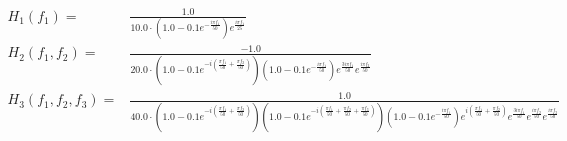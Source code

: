 \begin{align} 
 \scriptstyle H_1(f_1) =& \scriptstyle\frac{1.0}{10.0 \cdot \left(1.0 - 0.1 e^{- \frac{i \pi f_{1}}{50}}\right) e^{\frac{i \pi f_{1}}{25}}}\\ 
 \scriptstyle H_2(f_1,f_2) =& \scriptstyle\frac{-1.0}{20.0 \cdot \left(1.0 - 0.1 e^{- i \left(\frac{\pi f_{1}}{50} + \frac{\pi f_{2}}{50}\right)}\right) \left(1.0 - 0.1 e^{- \frac{i \pi f_{1}}{50}}\right) e^{\frac{3 i \pi f_{1}}{50}} e^{\frac{i \pi f_{2}}{50}}}\\ 
 \scriptstyle H_3(f_1,f_2,f_3) =& \scriptstyle\frac{1.0}{40.0 \cdot \left(1.0 - 0.1 e^{- i \left(\frac{\pi f_{1}}{50} + \frac{\pi f_{2}}{50}\right)}\right) \left(1.0 - 0.1 e^{- i \left(\frac{\pi f_{1}}{50} + \frac{\pi f_{2}}{50} + \frac{\pi f_{3}}{50}\right)}\right) \left(1.0 - 0.1 e^{- \frac{i \pi f_{1}}{50}}\right) e^{i \left(\frac{\pi f_{1}}{50} + \frac{\pi f_{2}}{50}\right)} e^{\frac{3 i \pi f_{1}}{50}} e^{\frac{i \pi f_{2}}{50}} e^{\frac{i \pi f_{3}}{50}}}
\end{align}